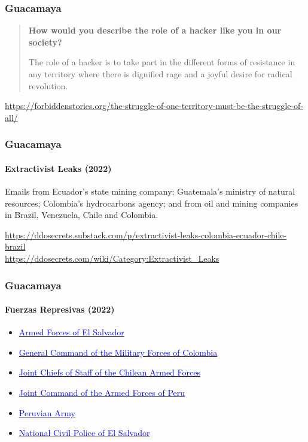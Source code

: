 \documentclass[aspectratio=169,usenames,dvipsnames]{beamer}
\begin{document}
\begin{frame}[c]
  \frametitle{Guacamaya}

  \begin{quote}
    \textbf{How would you describe the role of a hacker like you in our
    society?}

    \vspace{3mm} \pause

    The role of a hacker is to take part in the different forms of resistance
    in any territory where there is dignified rage and a joyful desire for
    radical revolution.
  \end{quote}

  \vfill \scriptsize \centering
  \url{https://forbiddenstories.org/the-struggle-of-one-territory-must-be-the-struggle-of-all/}

\end{frame}
\begin{frame}
  \frametitle{Guacamaya}
  \framesubtitle{Extractivist Leaks (2022)}

  Emails from Ecuador's state mining company; Guatemala's ministry of natural
  resources; Colombia's hydrocarbons agency; and from oil and mining companies
  in Brazil, Venezuela, Chile and Colombia.

  \vfill \footnotesize \centering
  \url{https://ddosecrets.substack.com/p/extractivist-leaks-colombia-ecuador-chile-brazil}\\
  \vspace{1mm}
  \url{https://ddosecrets.com/wiki/Category:Extractivist_Leaks}

\end{frame}
\begin{frame}
  \frametitle{Guacamaya}
  \framesubtitle{Fuerzas Represivas (2022)}

  \begin{itemize}[<+->]
    \item
      \href{https://ddosecrets.com/wiki/Fuerza_Armada_de_El_Salvador}{\textcolor{blue}{Armed Forces of El Salvador}}
    \item
      \href{https://ddosecrets.com/wiki/Comando_General_de_las_Fuerzas_Militares_de_Colombia}{\textcolor{blue}{General Command of the Military Forces of Colombia}}
    \item
      \href{https://ddosecrets.com/wiki/Estado_Mayor_Conjunto_de_las_Fuerza_Armadas_de_Chile}{\textcolor{blue}{Joint Chiefs of Staff of the Chilean Armed Forces}}
    \item
      \href{https://ddosecrets.com/wiki/Comando_Conjunto_de_las_Fuerzas_Armadas}{\textcolor{blue}{Joint Command of the Armed Forces of Peru}}
    \item
      \href{https://ddosecrets.com/wiki/Ej\%C3\%A9rcito_del_Per\%C3\%BA}{\textcolor{blue}{Peruvian Army}}
    \item
      \href{https://ddosecrets.com/wiki/Polic\%C3\%ADa_Nacional_Civil_de_El_Salvador}{\textcolor{blue}{National Civil Police of El Salvador}}
  \end{itemize}
\end{frame}
\end{document}
